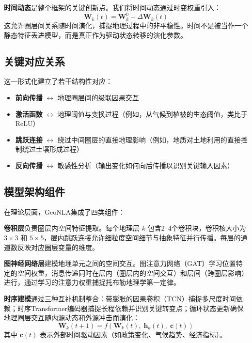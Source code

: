 \documentclass[11pt,a4paper]{article}
\begin{document}
\textbf{时间动态}是整个框架的关键创新点。我们将时间动态通过时变权重引入：
\begin{equation}
\mathbf{W}_k(t) = \mathbf{W}_k^0 + \Delta\mathbf{W}_k(t)
\end{equation}
这允许圈层间关系随时间演化，捕捉地理过程中的非平稳性。时间不是被当作一个静态特征丢进模型，而是真正作为驱动状态转移的演化参数。

\subsection{关键对应关系}

这一形式化建立了若干结构性对应：
\begin{itemize}[leftmargin=*]
  \item \textbf{前向传播} $\leftrightarrow$ 地理圈层间的级联因果交互
  \item \textbf{激活函数} $\leftrightarrow$ 地理阈值与变换过程（例如，从气候到植被的生态阈值，类比于ReLU）
  \item \textbf{跳跃连接} $\leftrightarrow$ 绕过中间圈层的直接地理影响（例如，地质对土地利用的直接控制绕过土壤形成过程）
  \item \textbf{反向传播} $\leftrightarrow$ 敏感性分析（输出变化如何向后传播以识别关键输入因素）
\end{itemize}

\subsection{模型架构组件}

在理论层面，GeoNLA集成了四类组件：

\textbf{卷积层}负责圈层内空间特征提取。每个地理层 $k$ 包含2–4个卷积块，卷积核大小为 $3{\times}3$ 和 $5{\times}5$，层内跳跃连接允许细粒度空间细节与抽象特征并行传播。每层的通道数反映对应圈层变量的维度。

\textbf{图神经网络层}建模地理单元之间的空间交互。图注意力网络（GAT）学习位置特定的空间权重，消息传递同时在层内（圈层内的空间交互）和层间（跨圈层影响）进行，通过学习的注意力权重捕捉托布勒地理学第一定律。

\textbf{时序建模}通过三种互补机制整合：带膨胀的因果卷积（TCN）捕捉多尺度时间依赖；时序Transformer编码器捕捉长程依赖并识别关键转变点；循环状态更新确保地理圈层交互随内源动态和外源冲击而演化：
\begin{equation}
\mathbf{W}_k(t{+}1) = f\!\left(\mathbf{W}_k(t),\; \mathbf{h}_k(t),\; \mathbf{c}(t)\right)
\end{equation}
其中 $\mathbf{c}(t)$ 表示外部时间驱动因素（如政策变化、气候趋势、经济指标）。
\end{document}
